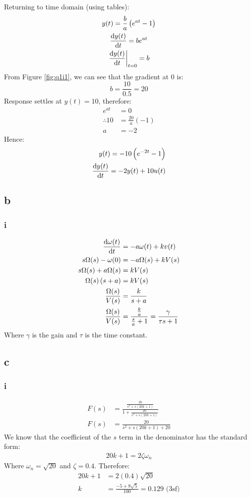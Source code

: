 \documentclass[11pt]{article}
\numberwithin{equation}{section}
\begin{document}
Returning to time domain (using tables):
\begin{gather}
    y(t) = \frac{b}{a} \left(e^{at}-1\right) \label{eq:q1i2}\\
    \frac{\dif y(t)}{\dif t} = be^{at}\\
    \left. \frac{\dif y(t)}{\dif t} \right|_{t = 0} = b
\end{gather}
From Figure \ref{fig:q1i1}, we can see that the gradient at 0 is:
\begin{equation}
    b = \frac{10}{0.5} = 20
\end{equation}
Response settles at $y(t) = 10$, therefore:
\begin{align}
    e^{at} &= 0\\
    \therefore 10 &= \frac{20}{a}\left(-1\right)\\
    a &= -2
\end{align}
Hence:
\begin{align}
    y(t) = -10 \left(e^{-2t}-1\right)\\
    \frac{\dif y(t)}{\dif t} = -2y(t) + 10u(t)
\end{align}
\subsection{b}
\subsubsection{i}
\begin{align}
    \frac{\dif \omega(t)}{\dif t} &= -a\omega(t) + kv(t)\\
    s \Omega(s) - \omega(0) &= -a \Omega(s) + kV(s)\\
    s\Omega(s) +a\Omega (s) &= kV(s)\\
    \Omega(s)\left(s+a\right) &= kV(s)\\
    \frac{\Omega (s)}{V(s)} &= \frac{k}{s+a}\\
    \frac{\Omega (s)}{V(s)} &= \frac{\frac{k}{a}}{\frac{s}{a}+1} = \frac{\gamma}{\tau s + 1}
\end{align}
Where $\gamma$ is the gain and $\tau$ is the time constant.
\subsection{c}
\subsubsection{i}
\begin{align}
    F(s) &= \frac{\frac{20}{s^2 + s(20k+1)}}{1 + \frac{20}{s^2 + s(20k+1)}}\\
    F(s) &= \frac{20}{s^2 + s(20k+1) + 20}
\end{align}
We know that the coefficient of the $s$ term in the denominator has the standard form: 
\begin{align}
    20k+ 1 = 2\zeta \omega_n
\end{align}
Where $\omega_n = \sqrt{20}$ and $\zeta = 0.4$. Therefore:
\begin{align}
    20 k + 1 &= 2 (0.4)\sqrt{20}\\
    k &= \frac{-5+8\sqrt{5}}{100} = 0.129 \textrm{ (3sf)}
\end{align}
\end{document}
